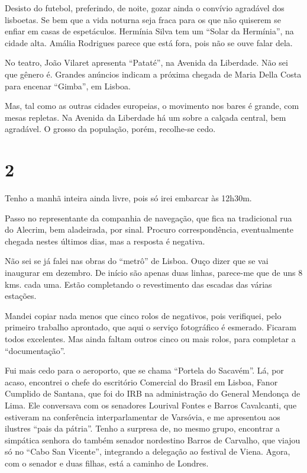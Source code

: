 Desisto do futebol, preferindo, de noite, gozar ainda o convívio agradável dos lisboetas. Se bem que a vida noturna seja fraca para os que não quiserem se enfiar em casas de espetáculos. Hermínia Silva tem um “Solar da Hermínia”, na cidade alta. Amália Rodrigues parece que está fora, pois não se ouve falar dela.

No teatro, João Vilaret apresenta “Pataté”, na Avenida da Liberdade. Não sei que gênero é. Grandes anúncios indicam a próxima chegada de Maria Della Costa para encenar “Gimba”, em Lisboa.

Mas, tal como as outras cidades europeias, o movimento nos bares é grande, com mesas repletas. Na Avenida da Liberdade há um sobre a calçada central, bem agradável. O grosso da população, porém, recolhe-se cedo.

\section*{2 \adfflatleafright {}}
Tenho a manhã inteira ainda livre, pois só irei embarcar às 12h30m.

Passo no representante da companhia de navegação, que fica na tradicional rua do Alecrim, bem aladeirada, por sinal. Procuro correspondência, eventualmente chegada nestes últimos dias, mas a resposta é negativa.

Não sei se já falei nas obras do “metrô” de Lisboa. Ouço dizer que se vai inaugurar em dezembro. De início são apenas duas linhas, parece-me que de uns 8 kms. cada uma. Estão completando o revestimento das escadas das várias estações.

Mandei copiar nada menos que cinco rolos de negativos, pois verifiquei, pelo primeiro trabalho aprontado, que aqui o serviço fotográfico é esmerado. Ficaram todos excelentes. Mas ainda faltam outros cinco ou mais rolos, para completar a “documentação”.

Fui mais cedo para o aeroporto, que se chama “Portela do Sacavém”. Lá, por acaso, encontrei o chefe do escritório Comercial do Brasil em Lisboa, Fanor Cumplido de Santana, que foi do IRB na administração do General Mendonça de Lima. Ele conversava com os senadores Lourival Fontes e Barros Cavalcanti, que estiveram na conferência interparlamentar de Varsóvia, e me apresentou aos ilustres “pais da pátria”. Tenho a surpresa de, no mesmo grupo, encontrar a simpática senhora do também senador nordestino Barros de Carvalho, que viajou só no “Cabo San Vicente”, integrando a delegação ao festival de Viena. Agora, com o senador e duas filhas, está a caminho de Londres.


